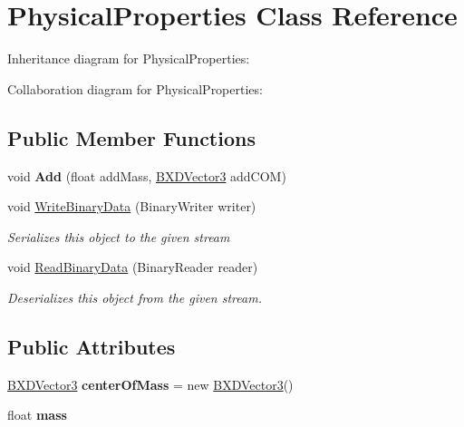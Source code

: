 \hypertarget{class_physical_properties}{}\section{Physical\+Properties Class Reference}
\label{class_physical_properties}


Inheritance diagram for Physical\+Properties\+:


Collaboration diagram for Physical\+Properties\+:
\subsection*{Public Member Functions}
\begin{DoxyCompactItemize}
\item 
\mbox{\label{class_physical_properties_a855105022fd04e170a1d0acc81cba788}} 
void {\bfseries Add} (float add\+Mass, \hyperlink{class_b_x_d_vector3}{B\+X\+D\+Vector3} add\+C\+OM)
\item 
void \hyperlink{class_physical_properties_afcdfb13e380a0b9870af47fb7785d4de}{Write\+Binary\+Data} (Binary\+Writer writer)
\begin{DoxyCompactList}\small\item\em Serializes this object to the given stream \end{DoxyCompactList}\item 
void \hyperlink{class_physical_properties_a9d38ac741d7aae550b0adb7f48d09ad9}{Read\+Binary\+Data} (Binary\+Reader reader)
\begin{DoxyCompactList}\small\item\em Deserializes this object from the given stream. \end{DoxyCompactList}\end{DoxyCompactItemize}
\subsection*{Public Attributes}
\begin{DoxyCompactItemize}
\item 
\mbox{\label{class_physical_properties_a94af2a99f595998dd11b7298dd39c66c}} 
\hyperlink{class_b_x_d_vector3}{B\+X\+D\+Vector3} {\bfseries center\+Of\+Mass} = new \hyperlink{class_b_x_d_vector3}{B\+X\+D\+Vector3}()
\item 
\mbox{\label{class_physical_properties_a9aa3ec9b1621d76b09d30b8870bf9291}} 
float {\bfseries mass}
\end{DoxyCompactItemize}


